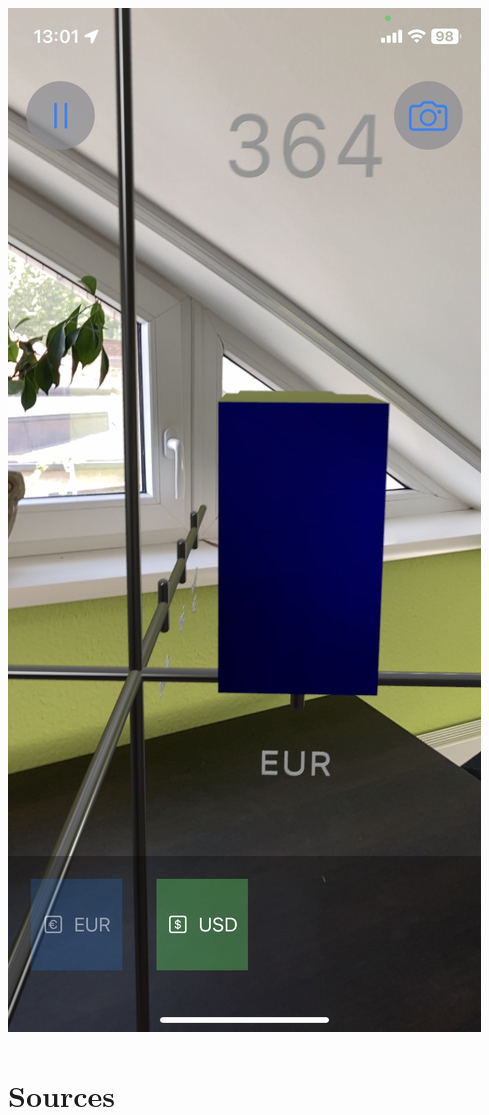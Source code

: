\documentclass{report}
\begin{document}
\includegraphics[scale=0.2]{not_available.jpeg}


\chapter{Sources}
\end{document}

